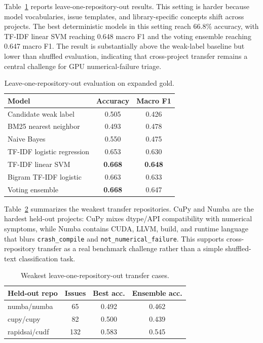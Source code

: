 \documentclass[conference]{IEEEtran}
\begin{document}
Table~\ref{tab:loro} reports leave-one-repository-out results. This setting is
harder because model vocabularies, issue templates, and library-specific
concepts shift across projects. The best deterministic models in this setting
reach 66.8\% accuracy, with TF-IDF linear SVM reaching 0.648 macro F1 and the
voting ensemble reaching 0.647 macro F1. The result is substantially above the
weak-label baseline but lower than shuffled evaluation, indicating that
cross-project transfer remains a central challenge for GPU numerical-failure
triage.

\begin{table}[t]
\centering
\caption{Leave-one-repository-out evaluation on expanded gold.}
\label{tab:loro}
\begin{tabular}{lcc}
\toprule
Model & Accuracy & Macro F1 \\
\midrule
Candidate weak label & 0.505 & 0.426 \\
BM25 nearest neighbor & 0.493 & 0.478 \\
Naive Bayes & 0.550 & 0.475 \\
TF-IDF logistic regression & 0.653 & 0.630 \\
TF-IDF linear SVM & \textbf{0.668} & \textbf{0.648} \\
Bigram TF-IDF logistic & 0.663 & 0.633 \\
Voting ensemble & \textbf{0.668} & 0.647 \\
\bottomrule
\end{tabular}
\end{table}

Table~\ref{tab:repo_weakness} summarizes the weakest transfer repositories.
CuPy and Numba are the hardest held-out projects: CuPy mixes dtype/API
compatibility with numerical symptoms, while Numba contains CUDA, LLVM, build,
and runtime language that blurs \texttt{crash\_compile} and
\texttt{not\_numerical\_failure}. This supports cross-repository transfer as a
real benchmark challenge rather than a simple shuffled-text classification
task.

\begin{table}[t]
\centering
\caption{Weakest leave-one-repository-out transfer cases.}
\label{tab:repo_weakness}
\begin{tabular}{lccc}
\toprule
Held-out repo & Issues & Best acc. & Ensemble acc. \\
\midrule
numba/numba & 65 & 0.492 & 0.462 \\
cupy/cupy & 82 & 0.500 & 0.439 \\
rapidsai/cudf & 132 & 0.583 & 0.545 \\
\bottomrule
\end{tabular}
\end{table}
\end{document}
